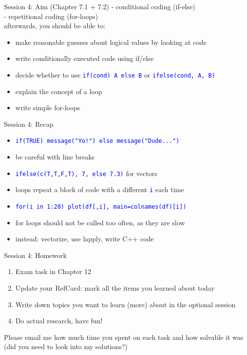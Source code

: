 \documentclass[xcolor=table,           xcolor=dvipsnames]{beamer}\usepackage[]{graphicx}\usepackage[]{color}
\newcommand{\rcode}[1]{\texttt{\textcolor{Blue}{#1}}} %
\begin{document}
\begin{frame}{Session 4: Aim (Chapter 7.1 + 7.2)}
\pause - conditional coding (if-else)\\
\pause - repetitional coding (for-loops)\\
\pause afterwards, you should be able to:
\pause
\begin{itemize}[<+->]
\item make reasonable guesses about logical values by looking at code
\item write conditionally executed code using if/else
\item decide whether to use \rcode{if(cond) A else B} or \rcode{ifelse(cond, A, B)}
\item explain the concept of a loop
\item write simple for-loops
\end{itemize}
\end{frame}


\begin{frame}[fragile]{Session 4: Recap}
\begin{itemize}[<+->]
\item \rcode{if(TRUE) message("Yo!") else message("Dude...")}
\item be careful with line breaks
\item \rcode{ifelse(c(T,T,F,T), 7, else 7.3)} for vectors
\item loops repeat a block of code with a different \rcode{i} each time
\item \rcode{for(i in 1:20) plot(df[,i], main=colnames(df)[i])}
\item for loops should not be called too often, as they are slow
\item instead: vectorize, use lapply, write C++ code
\end{itemize}
\end{frame}


\begin{frame}{Session 4: Homework }
\begin{enumerate}[<+->]
  \item Exam task in Chapter 12
  \item Update your RefCard: mark all the items you learned about today
  \item Write down topics you want to learn (more) about in the optional session
  \item Do actual research, have fun!
\end{enumerate}
\onslide<+->
Please email me how much time you spent on each task and how solvable it was (did you need to look into my solutions?)
\end{frame}
\end{document}
